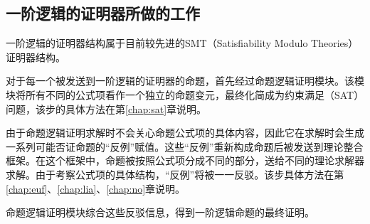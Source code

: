 \subsection{一阶逻辑的证明器所做的工作}
一阶逻辑的证明器结构属于目前较先进的SMT（Satisfiability Modulo Theories）证明器结构。

对于每一个被发送到一阶逻辑的证明器的命题，首先经过命题逻辑证明模块。该模块将所有不同的公式项看作一个独立的命题变元，最终化简成为约束满足（SAT）问题，该步的具体方法在第\ref{chap:sat}章说明。

由于命题逻辑证明求解时不会关心命题公式项的具体内容，因此它在求解时会生成一系列可能否证命题的``反例''赋值。这些``反例''重新构成命题后被发送到理论整合框架。在这个框架中，命题被按照公式项分成不同的部分，送给不同的理论求解器求解。由于考察公式项的具体结构，``反例''将被一一反驳。该步具体方法在第\ref{chap:euf}、\ref{chap:lia}、\ref{chap:no}章说明。

命题逻辑证明模块综合这些反驳信息，得到一阶逻辑命题的最终证明。
